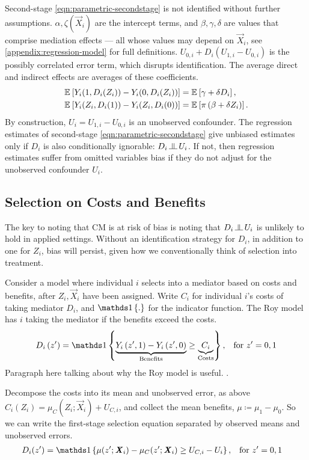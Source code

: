 Second-stage \eqref{eqn:parametric-secondstage} is not identified without further assumptions.
$\alpha, \zeta(\vec X_i)$ are the intercept terms, and $\beta, \gamma, \delta$ are values that comprise mediation effects --- all whose values may depend on $\vec X_i$, see \autoref{appendix:regression-model} for full definitions.
$U_{0,i} + D_i \left( U_{1,i} - U_{0,i} \right)$ is the possibly correlated error term, which disrupts identification.
The average direct and indirect effects are averages of these coefficients.
\begin{align*}
    \mathbb{E}_{} \left[ Y_i(1, D_i(Z_i)) - Y_i(0, D_i(Z_i)) \right]
        &= \mathbb{E}_{} \left[ \gamma + \delta D_i \right], \\
    \mathbb{E}_{} \left[ Y_i(Z_i, D_i(1)) - Y_i(Z_i, D_i(0)) \right]
        &= \mathbb{E}_{} \left[ \pi \left( \beta +  \delta Z_i \right) \right].
\end{align*}
By construction, $U_i = U_{1, i} - U_{0, i}$ is an unobserved confounder.
The regression estimates of second-stage \eqref{eqn:parametric-secondstage} give unbiased estimates only if $D_i$ is also conditionally ignorable: $D_i \indep  U_i$.
If not, then regression estimates suffer from omitted variables bias if they do not adjust for the unobserved confounder $U_i$.

\subsection{Selection on Costs and Benefits}
The key to noting that CM is at risk of bias is noting that $D_i \indep  U_i$ is unlikely to hold in applied settings.
Without an identification strategy for $D_i$, in addition to one for $Z_i$, bias will persist, given how we conventionally think of selection into treatment.

Consider a model where individual $i$ selects into a mediator based on costs and benefits, after $Z_i, \vec X_i$ have been assigned.
Write $C_i$ for individual $i$'s costs of taking mediator $D_i$, and $\indicator{.}$ for the indicator function.
The Roy model has $i$ taking the mediator if the benefits exceed the costs.
\[ D_i \left( z' \right) = \indicator{
    \underbrace{Y_i\left( z', 1 \right) - Y_i\left( z', 0 \right)}_{\text{Benefits}}
    \geq \underbrace{C_i}_{\text{Costs}}}, \;\;\; \text{for } z'=0,1 \]
Paragraph here talking about why the Roy model is useful.
\citep{roy1951some,heckman1990empirical}.

Decompose the costs into its mean and unobserved error, as above $C_i(Z_i) = \mu_{C}(Z_i; \vec X_i) + U_{C,i}$, and collect the mean benefits, $\mu \coloneqq \mu_1 - \mu_0$.
So we can write the first-stage selection equation separated by observed means and unobserved errors.
\begin{align*}
    D_i(z') &= \indicator{
        \mu(z'; \vec X_i) - \mu_C(z'; \vec X_i) \geq U_{C,i} - U_i }
        , \;\;\; \text{for } z'=0,1
\end{align*}

